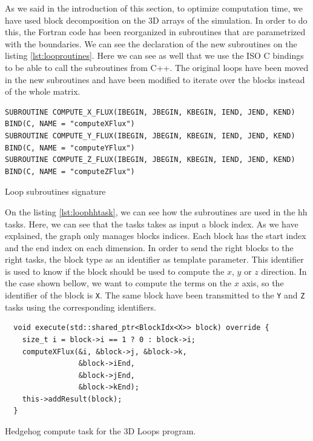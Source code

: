 As we said in the introduction of this section, to optimize computation time, we
have used block decomposition on the 3D arrays of the simulation. In order to do
this, the Fortran code has been reorganized in subroutines that are parametrized
with the boundaries. We can see the declaration of the new subroutines on the
listing \ref{lst:looproutines}. Here we can see as well that we use the ISO C
bindings to be able to call the subroutines from C++. The original loops have
been moved in the new subroutines and have been modified to iterate over the
blocks instead of the whole matrix.
\clearpage{}

\begin{listing}[ht!]
\begin{verbatim}
SUBROUTINE COMPUTE_X_FLUX(IBEGIN, JBEGIN, KBEGIN, IEND, JEND, KEND) BIND(C, NAME = "computeXFlux")
SUBROUTINE COMPUTE_Y_FLUX(IBEGIN, JBEGIN, KBEGIN, IEND, JEND, KEND) BIND(C, NAME = "computeYFlux")
SUBROUTINE COMPUTE_Z_FLUX(IBEGIN, JBEGIN, KBEGIN, IEND, JEND, KEND) BIND(C, NAME = "computeZFlux")
\end{verbatim}
\caption{Loop subroutines signature}
\label{lst:looproutines}
\end{listing}

On the listing \ref{lst:loophhtask}, we can see how the subroutines are used in
the \gls{hh} tasks. Here, we can see that the tasks takes as input a block
index. As we have explained, the graph only manages blocks indices. Each block
has the start index and the end index on each dimension. In order to send the
right blocks to the right tasks, the block type as an identifier as template
parameter. This identifier is used to know if the block should be used to
compute the $x$, $y$ or $z$ direction. In the case shown bellow, we want to compute
the terms on the $x$ axis, so the identifier of the block is \texttt{X}.
The same block have been transmitted to the \texttt{Y} and \texttt{Z} tasks
using the corresponding identifiers.

\begin{listing}[ht!]
\begin{verbatim}
  void execute(std::shared_ptr<BlockIdx<X>> block) override {
    size_t i = block->i == 1 ? 0 : block->i;
    computeXFlux(&i, &block->j, &block->k,
                 &block->iEnd,
                 &block->jEnd,
                 &block->kEnd);
    this->addResult(block);
  }
\end{verbatim}
\caption{Hedgehog compute task for the 3D Loops program.}
\label{lst:loophhtask}
\end{listing}

